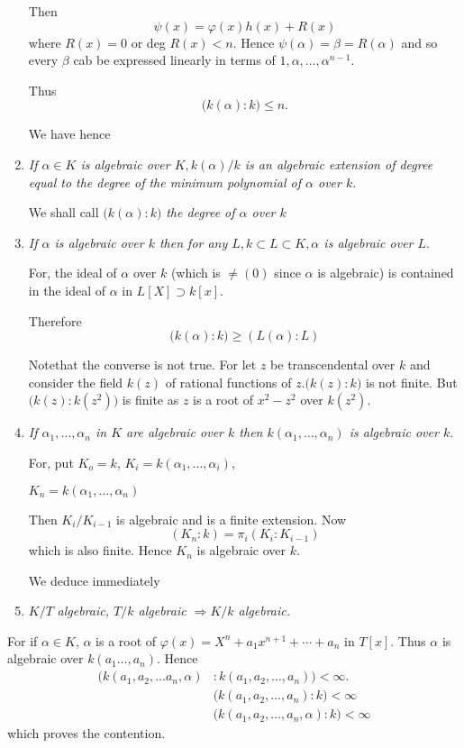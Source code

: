 \begin{enumerate}[1)]
Then
$$
\psi (x) = \varphi (x) h(x) + R(x)
$$
where $R(x) =0$ or deg $R(x) < n$. Hence $\psi (\alpha) = \beta =
R(\alpha)$ and so every $\beta$ cab be expressed linearly in terms of
$1, \alpha, \ldots, \alpha^{n-1}$.  

Thus
$$
\bigg( k(\alpha) : k \bigg) \le n.
$$

We have hence

\item \textit{If $\alpha \in K $ is algebraic over $K, k(\alpha) / k$
  is an algebraic extension of degree equal to the degree of the
  minimum polynomial of $\alpha$ over $k$}. 

We shall call $\bigg( k(\alpha) : k \bigg)$ \textit{the degree of
  $\alpha$ over $k$} 

\item \textit{If $\alpha$ is algebraic over $k$ then for any $L, k
  \subset L \subset K, \alpha$ is algebraic over $L$}. 

For, the ideal of $\alpha$ over $k$  (which is $\neq (0) $ since
$\alpha$ is algebraic) is contained in the ideal of $\alpha$ in $L [X]
\supset k [x]$. 

Therefore
$$
\bigg( k(\alpha) : k \bigg) \geq (L (\alpha) : L)
$$

Note\pageoriginale that the converse is not true. For let $z$ be
transcendental over 
$k$ and consider the field $k(z)$ of rational functions of $z. \bigg(
k(z) : k \bigg)$ is not finite. But $\bigg( k(z) : k  (z^2)\bigg)$ is
finite as $z$ is a root of $x^2 - z^2$ over $k(z^2)$. 

\item \textit{If $\alpha_1, \ldots, \alpha_n$ in $K$ are algebraic
  over $k$ then $k(\alpha_1, \ldots, \alpha_n)$ is algebraic over
  $k$}. 

For, put $K_o = k$, $K_i = k (\alpha_1, \ldots, \alpha_i)$, 

\noindent
$K_n = k (\alpha_1, \ldots, \alpha_n)$

Then $K_i/K_{i-1}$ is algebraic and is a finite extension. Now  
$$
(K_n : k) = \pi_i (K_i : K_{i-1})
$$
which is also finite. Hence $K_n$ is algebraic over $k$.

We deduce immediately

\item $K/T$ \textit{algebraic, $T/k$ algebraic $\Longrightarrow  K/k$ 
  algebraic.} 
\end{enumerate}

For if $\alpha \in K$, $\alpha$ is a root of $\varphi (x) = X^n + a_1
x^{n+1}+ \cdots + a_n$ in $T[x]$. Thus $\alpha$ is algebraic over $k
(a_1 \ldots , a_n)$. Hence   
\begin{align*}
\big(k(a_1, a_2, \ldots a_n, \alpha) & : k (a_1, a_2, \ldots, a_n)
\big) < \infty.\\
& \big(k(a_1, a_2, \ldots, a_n) : k \big) < \infty\\
& \big(k(a_1, a_2, \ldots, a_n, \alpha) : k \big) < \infty
\end{align*}
which proves the contention.

